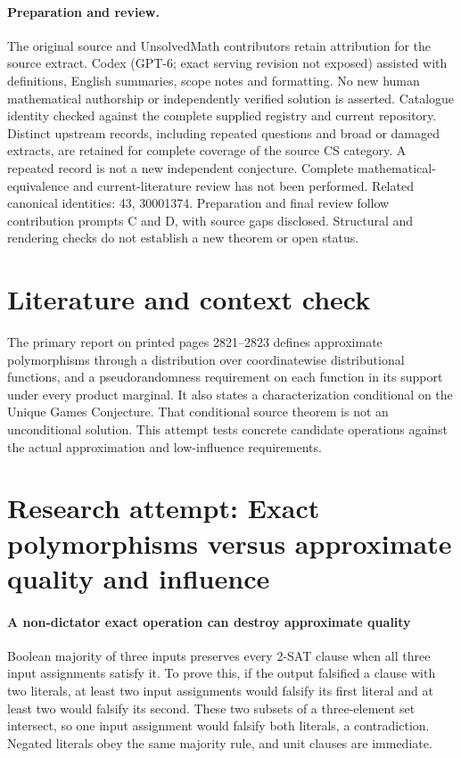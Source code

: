 \documentclass[11pt]{article}
\begin{document}
\paragraph{Preparation and review.}
The original source and UnsolvedMath contributors retain attribution for the source extract. Codex (GPT-6; exact serving revision not exposed) assisted with definitions, English summaries, scope notes and formatting. No new human mathematical authorship or independently verified solution is asserted. Catalogue identity checked against the complete supplied registry and current repository. Distinct upstream records, including repeated questions and broad or damaged extracts, are retained for complete coverage of the source CS category. A repeated record is not a new independent conjecture. Complete mathematical-equivalence and current-literature review has not been performed. Related canonical identities: 43, 30001374. Preparation and final review follow contribution prompts C and D, with source gaps disclosed. Structural and rendering checks do not establish a new theorem or open status.
\label{end:statement}

\section{Literature and context check}
The primary report on printed pages 2821--2823 defines approximate polymorphisms through a distribution over coordinatewise distributional functions, and a pseudorandomness requirement on each function in its support under every product marginal. It also states a characterization conditional on the Unique Games Conjecture. That conditional source theorem is not an unconditional solution. This attempt tests concrete candidate operations against the actual approximation and low-influence requirements.
\section{Research attempt: Exact polymorphisms versus approximate quality and influence}

\paragraph{A non-dictator exact operation can destroy approximate quality}
Boolean majority of three inputs preserves every 2-SAT clause when all three input assignments satisfy it. To prove this, if the output falsified a clause with two literals, at least two input assignments would falsify its first literal and at least two would falsify its second. These two subsets of a three-element set intersect, so one input assignment would falsify both literals, a contradiction. Negated literals obey the same majority rule, and unit clauses are immediate.
\end{document}
